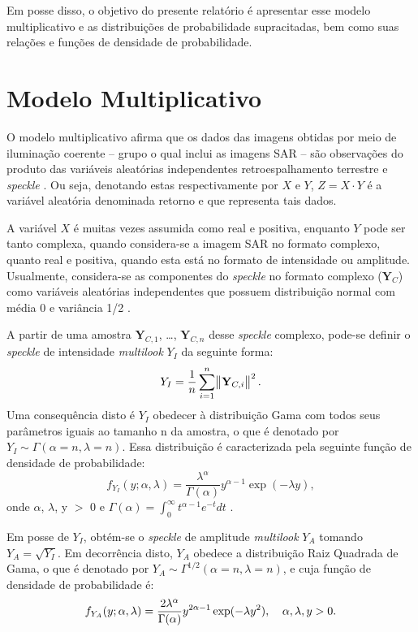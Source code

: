 \documentclass[12pt]{article}
\begin{document}
Em posse disso, o objetivo do presente relatório é apresentar esse modelo multiplicativo e as distribuições de probabilidade supracitadas, bem como suas relações e funções de densidade de probabilidade.

\section{Modelo Multiplicativo}

O modelo multiplicativo afirma que os dados das imagens obtidas por meio de iluminação coerente -- grupo o qual inclui as imagens SAR -- são observações do produto das variáveis aleatórias independentes retroespalhamento terrestre e \textit{speckle} \cite{mejail03}. Ou seja, denotando estas respectivamente por $X$ e $Y$, $Z = X \cdot Y$ é a variável aleatória denominada retorno e que representa tais dados.

A variável $X$ é muitas vezes assumida como real e positiva, enquanto $Y$ pode ser tanto complexa, quando considera-se a imagem SAR no formato complexo, quanto real e positiva, quando esta está no formato de intensidade ou amplitude. Usualmente, considera-se as componentes do \textit{speckle} no formato complexo ($\mathbf{Y}_C$) como variáveis aleatórias independentes que possuem distribuição normal com média 0 e variância 1/2 \cite{frery97}.

A partir de uma amostra $\mathbf{Y}_{C,1}$, \dots, $\mathbf{Y}_{C,n}$ desse \textit{speckle} complexo, pode-se definir o \textit{speckle} de intensidade \textit{multilook} $Y_I$ da seguinte forma:
\begin{displaymath}
   Y_I = \frac{1}{n} \sum_{i = 1}^{n}
   \norm{\mathbf{Y}_{C,i}}^2.
\end{displaymath}
Uma consequência disto é $Y_I$ obedecer à distribuição Gama com todos seus parâmetros iguais ao tamanho n da amostra, o que é denotado por $Y_I \sim \Gamma(\alpha = n, \lambda = n)$. Essa distribuição é caracterizada pela seguinte função de densidade de probabilidade:
\begin{displaymath}
    f_{Y_I}(y; \alpha, \lambda) = \frac{\lambda^\alpha}{\Gamma(\alpha)} y^{\alpha-1} \exp(-\lambda y),
\end{displaymath}
onde $\alpha$, $\lambda$, y $>$ 0 e $\Gamma(\alpha) = \int_{0}^{\infty} t^{\alpha-1} e^{-t} dt$ \cite{frery97}.

Em posse de $Y_I$, obtém-se o \textit{speckle} de amplitude \textit{multilook} $Y_A$ tomando $Y_A = \sqrt{Y_I}$. Em decorrência disto, $Y_A$ obedece a distribuição Raiz Quadrada de Gama, o que é denotado por $Y_A \sim \Gamma^{1/2}(\alpha = n, \lambda = n)$, e cuja função de densidade de probabilidade é:
\begin{displaymath}
    f_{Y_A}(y; \alpha, \lambda) = \frac{2\lambda^\alpha}{\Gamma(\alpha)} y^{2\alpha-1} \exp(-\lambda y^2), \hspace{.03\linewidth} \alpha, \lambda, y > 0.
\end{displaymath}
\end{document}
